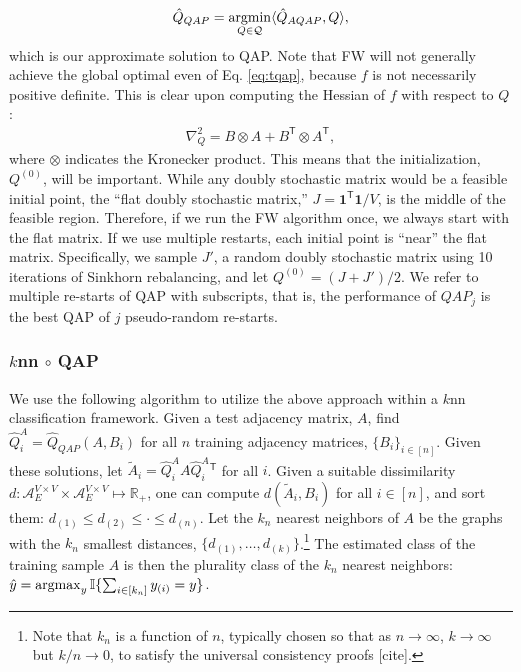 \documentclass{article} %
\providecommand{\ve}[1]{\boldsymbol{#1}}
\newcommand{\argmax}{\operatornamewithlimits{argmax}}
\newcommand{\argmin}{\operatornamewithlimits{argmin}}
\newcommand{\T}{^{\ensuremath{\mathsf{T}}}}           %
\newcommand{\II}{\mathbb{I}}           %
\providecommand{\mc}[1]{\mathcal{#1}}
\providecommand{\mh}[1]{\hat{#1}}
\providecommand{\mt}[1]{\widetilde{#1}}
\newcommand{\Real}{\mathbb{R}}
\newcommand{\conv}{\rightarrow}
\begin{document}
\begin{align}
	\mh{Q}_{QAP} = \argmin_{Q \in \mc{Q}} \langle \mh{Q}_{AQAP}, Q \rangle,
\end{align}
which is our approximate solution to QAP.  Note that FW will not generally achieve the global optimal even of Eq. \eqref{eq:tqap}, because $f$ is not necessarily positive definite.  This is clear upon computing the Hessian of $f$  with respect to $Q$:
\begin{align}
	\nabla_Q^2  =  B \otimes A + B\T \otimes A\T,
\end{align}
where $\otimes$ indicates the Kronecker product. This means that the initialization, $Q^{(0)}$, will be important.  While any doubly stochastic matrix would be a feasible initial point,  the ``flat doubly  stochastic matrix,'' $J=\ve{1}\T \ve{1}/V$, is the middle of the feasible region.  Therefore, if we run the FW algorithm once, we always start with the flat matrix.  If we use multiple restarts, each initial point is ``near'' the flat matrix.  Specifically, we sample $J'$, a random doubly stochastic matrix using 10 iterations of Sinkhorn rebalancing, and let $Q^{(0)}=(J+J')/2$.  We refer to multiple re-starts of QAP with subscripts, that is, the performance of $QAP_j$ is the best QAP of $j$ pseudo-random re-starts.



\subsubsection{$k$nn $\circ$ QAP} %
\label{ssub:_k_nn_circ_qap}


We use the following algorithm to utilize the above approach within a $k$nn classification framework.  Given a test adjacency matrix, $A$, find $\mh{Q}_i^A=\mh{Q}_{QAP}(A,B_i)$ for all $n$ training adjacency matrices, $\{B_i\}_{i \in [n]}$.  Given these solutions, let $\mt{A}_i=\mh{Q}_i^A A {\mh{Q}_i^A}{}\T$ for all $i$. Given a suitable dissimilarity $d: \mc{A}_E^{V\times V} \times \mc{A}_E^{V\times V} \mapsto \Real_+$, one can compute $d(\mt{A}_i,B_i)$ for all $i \in [n]$, and sort them: $d_{(1)} \leq d_{(2)} \leq \cdot \leq d_{(n)}$.  Let the $k_n$ nearest neighbors of $A$ be the graphs with the $k_n$ smallest distances, $\{d_{(1)},\ldots, d_{(k)}\}$.\footnote{Note that $k_n$ is a function of $n$, typically chosen so that as $n \conv \infty$, $k \conv \infty$ but $k/n \conv 0$, to satisfy the universal consistency proofs [cite].}  The estimated class of the training sample $A$ is then the plurality class of the $k_n$ nearest neighbors: $\mh{y}=\argmax_{y} \II\{\sum_{i \in [k_n]} y_{(i)} = y \}$.
\end{document}
